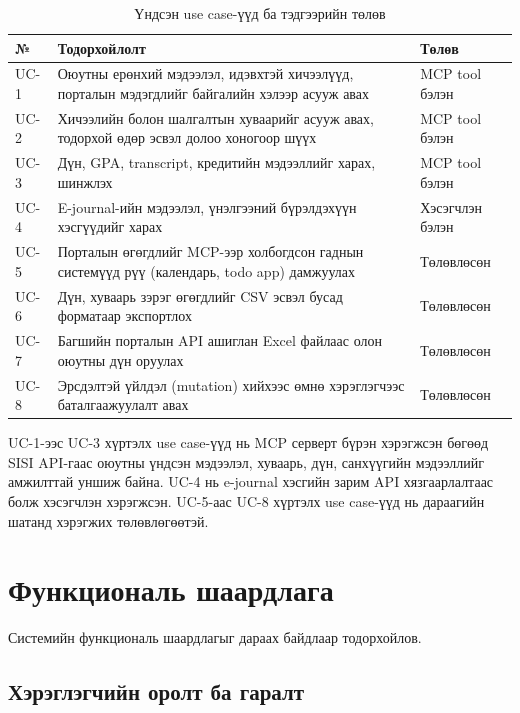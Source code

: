 \begin{table}[H]
  \centering
  \caption{Үндсэн use case-үүд ба тэдгээрийн төлөв}
  \label{tab:usecases}
  \begin{tabularx}{\textwidth}{>{\raggedright\arraybackslash}p{1cm} >{\raggedright\arraybackslash}X >{\raggedright\arraybackslash}p{3cm}}
    \toprule
    № & Тодорхойлолт & Төлөв \\
    \midrule
    UC-1 & Оюутны ерөнхий мэдээлэл, идэвхтэй хичээлүүд, порталын мэдэгдлийг байгалийн хэлээр асууж авах & MCP tool бэлэн \\
    UC-2 & Хичээлийн болон шалгалтын хуваарийг асууж авах, тодорхой өдөр эсвэл долоо хоногоор шүүх & MCP tool бэлэн \\
    UC-3 & Дүн, GPA, transcript, кредитийн мэдээллийг харах, шинжлэх & MCP tool бэлэн \\
    UC-4 & E-journal-ийн мэдээлэл, үнэлгээний бүрэлдэхүүн хэсгүүдийг харах & Хэсэгчлэн бэлэн \\
    UC-5 & Порталын өгөгдлийг MCP-ээр холбогдсон гаднын системүүд рүү (календарь, todo app) дамжуулах & Төлөвлөсөн \\
    UC-6 & Дүн, хуваарь зэрэг өгөгдлийг CSV эсвэл бусад форматаар экспортлох & Төлөвлөсөн \\
    UC-7 & Багшийн порталын API ашиглан Excel файлаас олон оюутны дүн оруулах & Төлөвлөсөн \\
    UC-8 & Эрсдэлтэй үйлдэл (mutation) хийхээс өмнө хэрэглэгчээс баталгаажуулалт авах & Төлөвлөсөн \\
    \bottomrule
  \end{tabularx}
\end{table}

UC-1-ээс UC-3 хүртэлх use case-үүд нь MCP серверт бүрэн хэрэгжсэн бөгөөд SISI API-гаас оюутны үндсэн мэдээлэл, хуваарь, дүн, санхүүгийн мэдээллийг амжилттай уншиж байна. UC-4 нь e-journal хэсгийн зарим API хязгаарлалтаас болж хэсэгчлэн хэрэгжсэн. UC-5-аас UC-8 хүртэлх use case-үүд нь дараагийн шатанд хэрэгжих төлөвлөгөөтэй.

\section{Функциональ шаардлага}

Системийн функциональ шаардлагыг дараах байдлаар тодорхойлов.

\subsection{Хэрэглэгчийн оролт ба гаралт}

